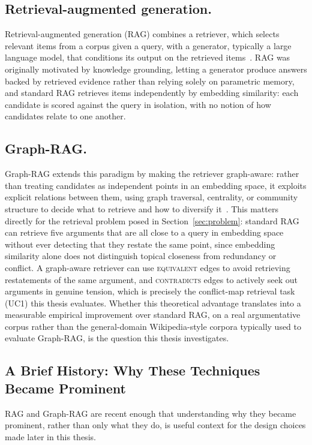 \subsection{Retrieval-augmented generation.}
Retrieval-augmented generation (RAG) combines a retriever, which selects relevant items from a
corpus given a query, with a generator, typically a large language model, that conditions its
output on the retrieved items~\cite{lewis2020rag}. RAG was originally motivated by knowledge
grounding, letting a generator produce answers backed by retrieved evidence rather than relying
solely on parametric memory, and standard RAG retrieves items independently by embedding
similarity: each candidate is scored against the query in isolation, with no notion of how
candidates relate to one another.

\subsection{Graph-RAG.}
Graph-RAG extends this paradigm by making the retriever graph-aware: rather than treating
candidates as independent points in an embedding space, it exploits explicit relations between
them, using graph traversal, centrality, or community structure to decide what to retrieve and how
to diversify it~\cite{edge2024graphrag}. This matters directly for the retrieval problem posed in
Section~\ref{sec:problem}: standard RAG can retrieve five arguments that are all close to a query
in embedding space without ever detecting that they restate the same point, since embedding
similarity alone does not distinguish topical closeness from redundancy or conflict. A
graph-aware retriever can use \textsc{equivalent} edges to avoid retrieving restatements of the
same argument, and \textsc{contradicts} edges to actively seek out arguments in genuine tension,
which is precisely the conflict-map retrieval task (UC1) this thesis evaluates. Whether this
theoretical advantage translates into a measurable empirical improvement over standard RAG, on a
real argumentative corpus rather than the general-domain Wikipedia-style corpora typically used
to evaluate Graph-RAG, is the question this thesis investigates.


\subsection{A Brief History: Why These Techniques Became Prominent}
\label{sec:background-history}

RAG and Graph-RAG are recent enough that understanding why they became prominent, rather than
only what they do, is useful context for the design choices made later in this thesis.


